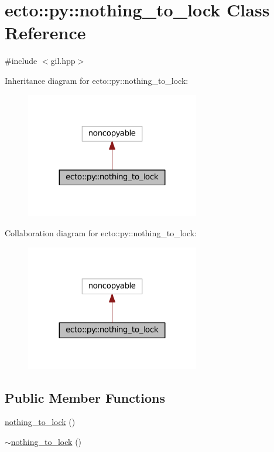 \hypertarget{classecto_1_1py_1_1nothing__to__lock}{}\section{ecto\+:\+:py\+:\+:nothing\+\_\+to\+\_\+lock Class Reference}
\label{classecto_1_1py_1_1nothing__to__lock}


{\ttfamily \#include $<$gil.\+hpp$>$}



Inheritance diagram for ecto\+:\+:py\+:\+:nothing\+\_\+to\+\_\+lock\+:\nopagebreak
\begin{figure}[H]
\begin{center}
\leavevmode
\includegraphics[width=215pt]{classecto_1_1py_1_1nothing__to__lock__inherit__graph}
\end{center}
\end{figure}


Collaboration diagram for ecto\+:\+:py\+:\+:nothing\+\_\+to\+\_\+lock\+:\nopagebreak
\begin{figure}[H]
\begin{center}
\leavevmode
\includegraphics[width=215pt]{classecto_1_1py_1_1nothing__to__lock__coll__graph}
\end{center}
\end{figure}
\subsection*{Public Member Functions}
\begin{DoxyCompactItemize}
\item 
\hyperlink{classecto_1_1py_1_1nothing__to__lock_a277b110e856f61f30f645e4bed50c566}{nothing\+\_\+to\+\_\+lock} ()
\item 
\hyperlink{classecto_1_1py_1_1nothing__to__lock_aa734fa290aeb9aa7de729960aa12df9b}{$\sim$nothing\+\_\+to\+\_\+lock} ()
\end{DoxyCompactItemize}


